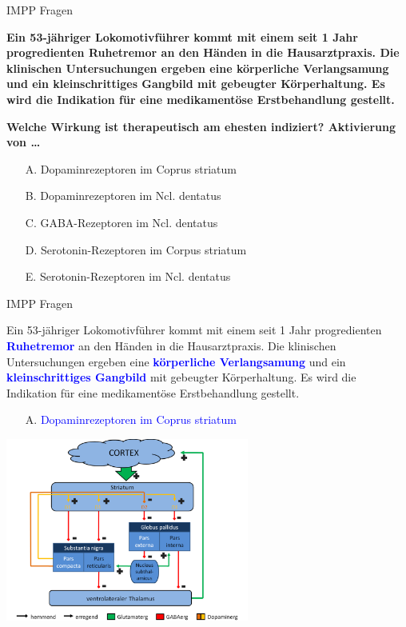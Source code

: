\documentclass{beamer}
\begin{document}


\begin{frame}{IMPP Fragen}
    
\textbf{Ein 53-jähriger Lokomotivführer kommt mit einem seit 1 Jahr progredienten Ruhetremor an den Händen in die Hausarztpraxis. Die klinischen Untersuchungen ergeben eine körperliche Verlangsamung und ein kleinschrittiges Gangbild mit gebeugter Körperhaltung. Es wird die Indikation für eine medikamentöse Erstbehandlung gestellt. }

\textbf{Welche Wirkung ist therapeutisch am ehesten indiziert? Aktivierung von \dots } \\[0.2 cm]

\begin{itemize}
\item[A.] Dopaminrezeptoren im Coprus striatum %
\item[B.] Dopaminrezeptoren im Ncl. dentatus 
\item[C.] GABA-Rezeptoren im Ncl. dentatus
\item[D.] Serotonin-Rezeptoren im Corpus striatum
\item[E.] Serotonin-Rezeptoren im Ncl. dentatus  

\end{itemize}    

\end{frame}



\begin{frame}{IMPP Fragen}
    
Ein 53-jähriger Lokomotivführer kommt mit einem seit 1 Jahr progredienten \textcolor{blue}{\textbf{Ruhetremor}} an den Händen in die Hausarztpraxis. Die klinischen Untersuchungen ergeben eine \textcolor{blue}{\textbf{körperliche Verlangsamung}} und ein \textcolor{blue}{\textbf{kleinschrittiges Gangbild}} mit gebeugter Körperhaltung. Es wird die Indikation für eine medikamentöse Erstbehandlung gestellt. 


\begin{itemize}
\item[A.] \textcolor{blue}{Dopaminrezeptoren im Coprus striatum} %
\end{itemize}    

\begin{center}
    \includegraphics[width=0.6\textwidth]{Basalganglien_all.png}
    
\end{center}


\end{frame}
\end{document}
